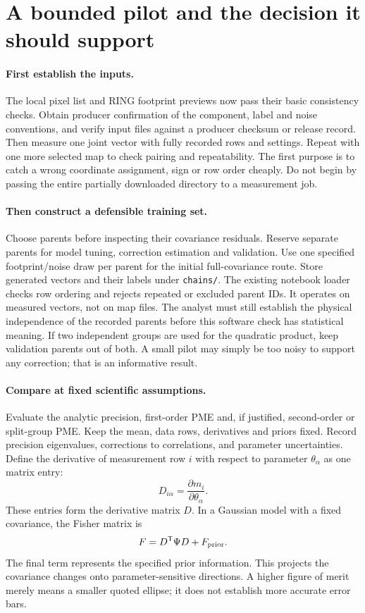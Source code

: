 \documentclass[11pt]{article}
\newcommand{\T}{^{\mathsf{T}}}
\begin{document}
\section{A bounded pilot and the decision it should support}
\paragraph{First establish the inputs.}
The local pixel list and RING footprint previews now pass their basic
consistency checks. Obtain producer confirmation of the component, label
and noise conventions, and verify input files against a producer checksum
or release record. Then measure one joint vector with fully
recorded rows and settings. Repeat with one more selected map to check
pairing and repeatability. The first purpose is to catch a wrong coordinate
assignment, sign or row order cheaply. Do not begin by passing the entire
partially downloaded directory to a measurement job.

\paragraph{Then construct a defensible training set.}
Choose parents before inspecting their covariance residuals. Reserve separate
parents for model tuning, correction estimation and validation. Use one
specified footprint/noise draw per parent for the initial full-covariance
route. Store generated vectors and their labels under \texttt{chains/}.
The existing notebook loader checks row ordering and rejects repeated or
excluded parent IDs. It operates on measured vectors, not on map files.
The analyst must still establish the physical independence of the recorded
parents before this software check has statistical meaning. If two independent groups are used for the quadratic product,
keep validation parents out of both. A small pilot may simply be too noisy
to support any correction; that is an informative result.

\paragraph{Compare at fixed scientific assumptions.}
Evaluate the analytic precision, first-order PME and, if justified,
second-order or split-group PME. Keep the mean, data rows, derivatives and
priors fixed. Record precision eigenvalues, corrections to correlations,
and parameter uncertainties. Define the derivative of measurement row $i$ with respect to parameter
$\theta_\alpha$ as one matrix entry:
\begin{equation}
 D_{i\alpha}=\frac{\partial m_i}{\partial\theta_\alpha}.
\end{equation}
These entries form the derivative matrix $D$. In a Gaussian model with a
fixed covariance, the Fisher matrix is
\begin{equation}
 F=D\T\Psi D+F_{\rm prior}.
\end{equation}
The final term represents the specified prior information. This projects the covariance changes onto
parameter-sensitive directions. A higher figure of merit merely means a
smaller quoted ellipse; it does not establish more accurate error bars.
\end{document}
